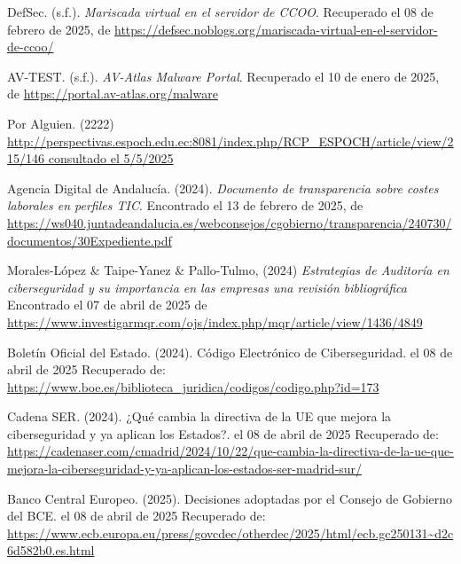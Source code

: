 \documentclass[a4paper, 10pt]{article}
\begin{document}
\begin{thebibliography}{20}
    
    DefSec. (s.f.). \textit{Mariscada virtual en el servidor de CCOO}. Recuperado el 08 de febrero de 2025, de \url{https://defsec.noblogs.org/mariscada-virtual-en-el-servidor-de-ccoo/}
    
    AV-TEST. (s.f.). \textit{AV-Atlas Malware Portal}. Recuperado el 10 de enero de 2025, de \url{https://portal.av-atlas.org/malware}
    
    Por Alguien. (2222) \url{http://perspectivas.espoch.edu.ec:8081/index.php/RCP_ESPOCH/article/view/215/146 consultado el 5/5/2025}
    
    Agencia Digital de Andalucía. (2024). \textit{Documento de transparencia sobre costes laborales en perfiles TIC}. Encontrado el 13 de febrero de 2025, de \url{https://ws040.juntadeandalucia.es/webconsejos/cgobierno/transparencia/240730/documentos/30Expediente.pdf}
    
    Morales-López \& Taipe-Yanez \& Pallo-Tulmo, (2024) \textit{Estrategias de Auditoría en ciberseguridad y su importancia en las empresas una revisión bibliográfica} Encontrado el 07 de abril de 2025 de \url{https://www.investigarmqr.com/ojs/index.php/mqr/article/view/1436/4849}

    Boletín Oficial del Estado. (2024). Código Electrónico de Ciberseguridad. el 08 de abril de 2025 Recuperado de: \url{https://www.boe.es/biblioteca_juridica/codigos/codigo.php?id=173}

    Cadena SER. (2024). ¿Qué cambia la directiva de la UE que mejora la ciberseguridad y ya aplican los Estados?. el 08 de abril de 2025 Recuperado de: \url{https://cadenaser.com/cmadrid/2024/10/22/que-cambia-la-directiva-de-la-ue-que-mejora-la-ciberseguridad-y-ya-aplican-los-estados-ser-madrid-sur/}

    Banco Central Europeo. (2025). Decisiones adoptadas por el Consejo de Gobierno del BCE. el 08 de abril de 2025 Recuperado de: \url{https://www.ecb.europa.eu/press/govcdec/otherdec/2025/html/ecb.gc250131~d2c6d582b0.es.html}


\end{thebibliography}
\end{document}
